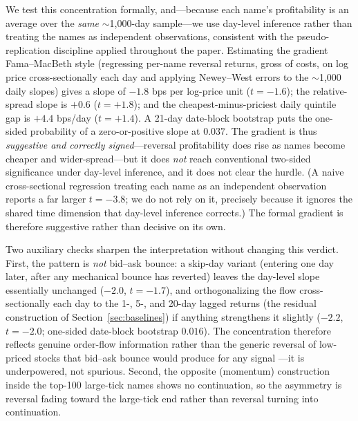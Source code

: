 \documentclass[11pt]{article}
\begin{document}
We test this concentration formally, and---because each name's profitability is an average over the \emph{same} $\sim$1{,}000-day sample---we use day-level inference rather than treating the names as independent observations, consistent with the pseudo-replication discipline applied throughout the paper. Estimating the gradient Fama--MacBeth style (regressing per-name reversal returns, gross of costs, on log price cross-sectionally each day and applying Newey--West errors to the $\sim$1{,}000 daily slopes) gives a slope of $-1.8$ bps per log-price unit ($t=-1.6$); the relative-spread slope is $+0.6$ ($t=+1.8$); and the cheapest-minus-priciest daily quintile gap is $+4.4$ bps/day ($t=+1.4$). A 21-day date-block bootstrap puts the one-sided probability of a zero-or-positive slope at $0.037$. The gradient is thus \emph{suggestive and correctly signed}---reversal profitability does rise as names become cheaper and wider-spread---but it does \emph{not} reach conventional two-sided significance under day-level inference, and it does not clear the \citet{harvey2016} hurdle. (A naive cross-sectional regression treating each name as an independent observation reports a far larger $t=-3.8$; we do not rely on it, precisely because it ignores the shared time dimension that day-level inference corrects.) The formal gradient is therefore suggestive rather than decisive on its own.

Two auxiliary checks sharpen the interpretation without changing this verdict. First, the pattern is \emph{not} bid--ask bounce: a skip-day variant (entering one day later, after any mechanical bounce has reverted) leaves the day-level slope essentially unchanged ($-2.0$, $t=-1.7$), and orthogonalizing the flow cross-sectionally each day to the 1-, 5-, and 20-day lagged returns (the residual construction of Section~\ref{sec:baselines}) if anything strengthens it slightly ($-2.2$, $t=-2.0$; one-sided date-block bootstrap $0.016$). The concentration therefore reflects genuine order-flow information rather than the generic reversal of low-priced stocks that bid--ask bounce would produce for any signal \citep{nagel2012}---it is underpowered, not spurious. Second, the opposite (momentum) construction inside the top-100 large-tick names shows no continuation, so the asymmetry is reversal fading toward the large-tick end rather than reversal turning into continuation.
\end{document}
